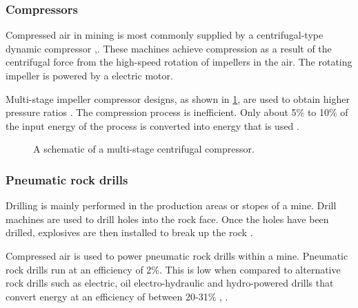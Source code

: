 \subsubsection{Compressors}

Compressed air in mining is most commonly supplied by a centrifugal-type dynamic compressor \cite{Fouche2016Masters},\cite{Booysen2012Masters}.  These machines achieve compression as a result of the centrifugal force from the high-speed rotation of impellers in the air. The rotating impeller is  powered by a electric motor.
\par 
 Multi-stage impeller compressor designs, as shown in \cref{fig: Compressor diagram}\footnotemark[1], are used to obtain higher pressure ratios \cite{Fouche2016Masters}. The compression process is inefficient. Only about 5\% to 10\% of the input energy of the process is converted into energy that is used \cite{yang2009air}. 
\begin{figure}[h]
	\centering
	\fbox{\hspace{3.5cm}\hspace{3cm}}
	\caption[A scematic of a multistage centrifugal compressor.]{A schematic of a multi-stage centrifugal compressor\protect \footnotemark[1].}
	\label{fig: Compressor diagram}
\end{figure}

\subsubsection{Pneumatic rock drills}
Drilling is mainly performed in the production areas or stopes of a mine. Drill machines are used to drill holes into the rock face. Once the holes have been drilled, explosives are then installed to break up the rock \cite{van2008development}.
\par
Compressed air is used to power pneumatic rock drills within a mine. Pneumatic rock drills run at an efficiency of 2\%. This is low when compared to alternative rock drills such as electric, oil electro-hydraulic and hydro-powered drills that convert energy at an efficiency of between 20-31\% \cite{fraser2008saving}, \cite{vanTonder2010Masters}. 
